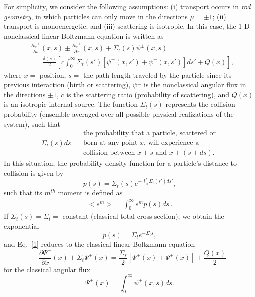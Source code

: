 \documentclass{anstrans}
\newcommand{\bl}{\big<}
\newcommand{\bg}{\big>}
\begin{document}
For simplicity, we consider the following assumptions: (i) transport occurs in \textit{rod geometry}, in which particles can only move in the directions $\mu=\pm 1$; (ii) transport is monoenergetic; and (iii) scattering is isotropic. In this case, the 1-D nonclassical linear Boltzmann equation is written as
\begin{align}
\label{1}
&\frac{\partial\psi^\pm}{\partial s}(x,s) \pm\frac{\partial\psi^\pm}{\partial x} (x,s) + \Sigma_t(s)\psi^\pm(x,s)\\
&\,\,= \frac{\delta(s)}{2}\left[ c\int_0^\infty \Sigma_t(s')\left[\psi^\pm(x,s') + \psi^\mp(x,s')\right]ds'+ Q(x) \right], \nonumber
\end{align}
where $x =$ position, $s =$ the path-length traveled by the particle since its previous
interaction (birth or scattering), $\psi^\pm$ is the nonclassical angular flux in the directions $\pm 1$, $c$ is the scattering ratio (probability of scattering), and $Q(x)$ is an isotropic internal source. The function $\Sigma_t(s)$ represents the collision probability (ensemble-averaged over all possible physical realizations of the system), such that
\begin{equation}
\Sigma_t(s)ds = \begin{array}{l}
\text{the probability that a particle, scattered or}\\
\text{born at any point $x$, will experience a}\\
\text{collision between $x + s$ and $x + (s+ds)$.}
\end{array} \nonumber
 \end{equation}
In this situation, the probability density function for a particle's distance-to-collision is given by
\begin{equation}\label{2}
p(s) = \Sigma_t(s)e^{-\int_0^s \Sigma_t(s')ds'}, 
\end{equation}
such that its $m^{th}$ moment is defined as
\begin{align}
\bl s^m \bg = \int_0^{\infty}s^mp(s)ds\,.\nonumber
\end{align}
If $\Sigma_t(s) = \Sigma_t = $ constant (classical total cross section), we obtain the exponential
\begin{equation}
p(s) = \Sigma_t e^{-\Sigma_ts},\label{3}
\end{equation}
and Eq.\ \eqref{1} reduces to the classical linear Boltzmann equation
\begin{equation}
\pm \frac{\partial \Psi^\pm}{\partial x}(x) + \Sigma_t \Psi^\pm(x) = \frac{\Sigma_s}{2}\left[\Psi^\pm(x)+\Psi^\mp(x)\right]+ \frac{Q(x)}{2} \nonumber
\end{equation}
for the classical angular flux 
\begin{equation}
\Psi^\pm(x) = \int_0^\infty \psi^\pm(x,s)ds. \nonumber
\end{equation} 
\end{document}
